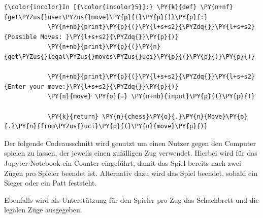     \begin{Verbatim}[commandchars=\\\{\}]
{\color{incolor}In [{\color{incolor}5}]:} \PY{k}{def} \PY{n+nf}{get\PYZus{}user\PYZus{}move}\PY{p}{(}\PY{p}{)}\PY{p}{:}
            \PY{n+nb}{print}\PY{p}{(}\PY{l+s+s2}{\PYZdq{}}\PY{l+s+s2}{Possible Moves: }\PY{l+s+s2}{\PYZdq{}}\PY{p}{)}
            \PY{n+nb}{print}\PY{p}{(}\PY{n}{get\PYZus{}legal\PYZus{}moves\PYZus{}uci}\PY{p}{(}\PY{p}{)}\PY{p}{)}
            
            \PY{n+nb}{print}\PY{p}{(}\PY{l+s+s2}{\PYZdq{}}\PY{l+s+s2}{Enter your move:}\PY{l+s+s2}{\PYZdq{}}\PY{p}{)}
            \PY{n}{move} \PY{o}{=} \PY{n+nb}{input}\PY{p}{(}\PY{p}{)}
                
            \PY{k}{return} \PY{n}{chess}\PY{o}{.}\PY{n}{Move}\PY{o}{.}\PY{n}{from\PYZus{}uci}\PY{p}{(}\PY{n}{move}\PY{p}{)}
\end{Verbatim}


    Der folgende Codeausschnitt wird genutzt um einen Nutzer gegen den
Computer spielen zu lassen, der jeweils einen zufälligen Zug verwendet.
Hierbei wird für das Jupyter Notebook ein Counter eingeführt, damit das
Spiel bereits nach zwei Zügen pro Spieler beendet ist. Alternativ dazu
wird das Spiel beendet, sobald ein Sieger oder ein Patt feststeht.

Ebenfalls wird als Unterstützung für den Spieler pro Zug das Schachbrett
und die legalen Züge ausgegeben.

